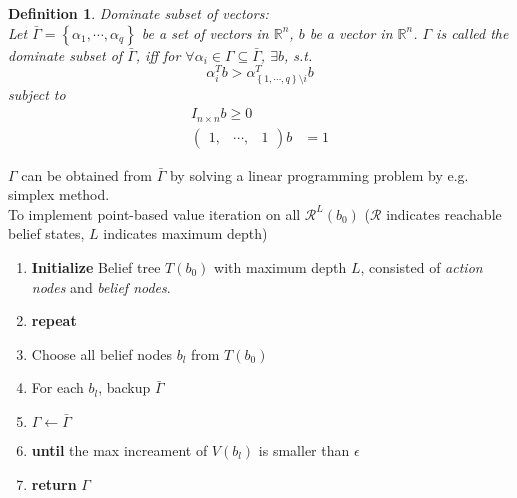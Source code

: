 \documentclass[a4paper,onecolumn]{article}
\newtheorem{mydef}{Definition}
\begin{document}
\begin{mydef}
    Dominate subset of vectors:\\
	\emph{Let $\bar{\Gamma}=\left\{\alpha_1,\cdots,\alpha_q\right\}$ 
	be a set of vectors in $\mathbb{R}^n$, $b$ be a vector
	in $\mathbb{R}^n$.
	$\Gamma$ is called the dominate subset of $\bar{\Gamma}$, iff
	for $\forall \alpha_i\in \Gamma\subseteq \bar{\Gamma}$, 
	$\exists b$, s.t. 
	\begin{equation}
	    \alpha_i^T b > \alpha_{\left\{1,\cdots,q\right\}\setminus i}^Tb
	\end{equation}
	subject to
	\begin{equation}\begin{split}
	    I_{n\times n}b \geq 0\\
		\begin{pmatrix}
		    1, &\cdots, &1
		\end{pmatrix}
		b &=1
	\end{split}\end{equation}
	}
\end{mydef}
\noindent $\Gamma$ can be obtained from $\bar{\Gamma}$ by solving a linear
programming problem by e.g. simplex method.\\
To implement point-based value iteration on all $\mathcal{R}^L(b_0)$
($\mathcal{R}$ indicates reachable belief states, $L$ indicates maximum
depth)
\begin{enumerate}
    \item \textbf{Initialize} Belief tree $T(b_0)$ with maximum depth $L$,
	consisted of \emph{action nodes} and \emph{belief nodes}.
	\item \textbf{repeat}
	\item \hspace{1cm}Choose all belief nodes $b_{l}$ from $T(b_0)$
	\item \hspace{1cm}For each $b_{l}$, backup $\bar{\Gamma}$
	\item \hspace{1cm}$\Gamma\leftarrow\bar{\Gamma}$
	\item \textbf{until} the max increament of $V(b_l)$ is smaller than
	$\epsilon$
	\item \textbf{return} $\Gamma$
\end{enumerate}
\end{document}

